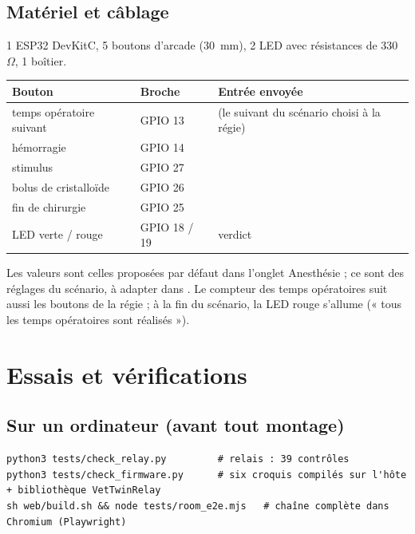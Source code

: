 \documentclass[11pt,a4paper]{article}
\begin{document}
\subsection{Matériel et câblage}
1 ESP32 DevKitC, 5 boutons d'arcade (30~mm), 2 LED avec résistances de 330~\(\Omega\), 1 boîtier.

\begin{tabularx}{\linewidth}{llL}
\toprule
\textbf{Bouton} & \textbf{Broche} & \textbf{Entrée envoyée} \\
\midrule
temps opératoire suivant & GPIO 13 &  (le suivant du scénario choisi à la régie) \\
hémorragie & GPIO 14 &  \\
stimulus & GPIO 27 &  \\
bolus de cristalloïde & GPIO 26 &  \\
fin de chirurgie & GPIO 25 &  \\
LED verte / rouge & GPIO 18 / 19 & verdict \\
\bottomrule
\end{tabularx}
Les valeurs sont celles proposées par défaut dans l'onglet Anesthésie ; ce sont des réglages du scénario, à adapter
dans . Le compteur des temps opératoires suit aussi les boutons de la
régie ; à la fin du scénario, la LED rouge s'allume (« tous les temps opératoires sont réalisés »).

\section{Essais et vérifications}\label{sec:essais}
\subsection{Sur un ordinateur (avant tout montage)}
\begin{Verbatim}
python3 tests/check_relay.py         # relais : 39 contrôles
python3 tests/check_firmware.py      # six croquis compilés sur l'hôte + bibliothèque VetTwinRelay
sh web/build.sh && node tests/room_e2e.mjs   # chaîne complète dans Chromium (Playwright)
\end{Verbatim}
\end{document}
